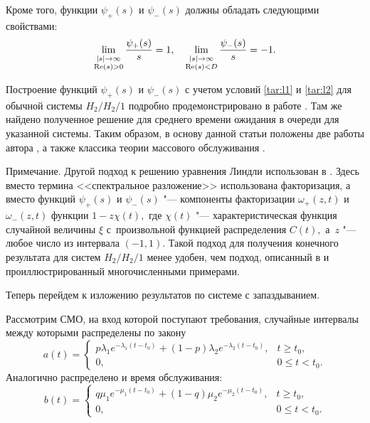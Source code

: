 Кроме того, функции $\psi_+(s)$  и  $\psi_-(s)$ должны обладать следующими свойствами:
\begin{equation}
\label{tar:l2}
\lim\limits_{
\stackrel{\scriptstyle \vert s\vert\to\infty}{\scriptstyle \mathop{\rm Re}(s)>0}}\frac{\psi_+(s)}{s}=1,\quad 
\lim\limits_{
\stackrel{\scriptstyle \vert s\vert\to\infty}{\scriptstyle \mathop{\rm Re}(s)<D}}\frac{\psi_-(s)}{s}=-1.
\end{equation}

Построение функций $\psi_+(s)$ и $\psi_-(s)$ с учетом условий \eqref{tar:l1} и \eqref{tar:l2} для обычной системы $H_2/H_2/1$ подробно продемонстрировано в работе \cite{tar:tarasov_2}. Там же найдено полученное решение для среднего времени ожидания в очереди для указанной системы. Таким образом, в основу данной статьи положены две работы автора \cite{tar:tarasov_1,tar:tarasov_2}, а также классика теории массового обслуживания \cite{tar:klein}.

\smallskip

{\small \sc Примечание.} 
Другой подход к решению уравнения Линдли использован в {\rm \cite{tar:boch}.} 
Здесь вместо термина <<спектральное разложение>>  использована факторизация, а вместо функций $\psi_+(s)$ и $\psi_-(s)$ "--- компоненты факторизации $\omega_+(z,t)$ и $\omega_-(z,t)$ функции $1-z\chi(t),$ 
где $\chi(t)$ "--- характеристическая функция случайной величины $\xi$ с~произвольной функцией распределения $C(t),$ а~$z$ "--- любое число из интервала $(-1, 1).$ 
Такой подход для получения конечного результата для систем $H_2/H_2/1$ менее удобен, чем подход, описанный в {\rm \cite{tar:klein}} и проиллюстрированный многочисленными примерами. 

\smallskip

Теперь перейдем к изложению результатов по системе с запаздыванием. 

\smallskip

Рассмотрим СМО, на вход которой поступают требования, случайные интервалы между которыми распределены по закону
\begin{equation}
\label{tar:l3}
a(t)=\left\{\begin{array}{cr}
p\lambda_1e^{-\lambda_1(t-t_0)}+(1-p)\lambda_2e^{-\lambda_2(t-t_0)},& t\geq t_0,
\\
0,& 0\leq t<t_0.\end{array}\right.
\end{equation}
Аналогично распределено и время обслуживания:
\begin{equation}
\label{tar:l4}
b(t)=\left\{\begin{array}{cr}
q\mu_1e^{-\mu_1(t-t_0)}+(1-q)\mu_2e^{-\mu_2(t-t_0)},& t\geq t_0,
\\
0,&  0\leq t<t_0.\end{array}\right.
\end{equation}

